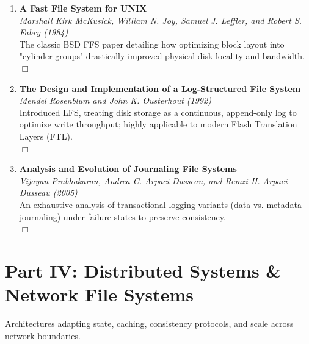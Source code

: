 \documentclass[11pt,a4paper]{article}
\begin{document}
\begin{enumerate}[resume]
    \item \textbf{A Fast File System for UNIX} \\
    \textit{Marshall Kirk McKusick, William N. Joy, Samuel J. Leffler, and Robert S. Fabry (1984)} \\
    The classic BSD FFS paper detailing how optimizing block layout into "cylinder groups" drastically improved physical disk locality and bandwidth. \\
    $\Box$
    
    \item \textbf{The Design and Implementation of a Log-Structured File System} \\
    \textit{Mendel Rosenblum and John K. Ousterhout (1992)} \\
    Introduced LFS, treating disk storage as a continuous, append-only log to optimize write throughput; highly applicable to modern Flash Translation Layers (FTL). \\
    $\Box$
    
    \item \textbf{Analysis and Evolution of Journaling File Systems} \\
    \textit{Vijayan Prabhakaran, Andrea C. Arpaci-Dusseau, and Remzi H. Arpaci-Dusseau (2005)} \\
    An exhaustive analysis of transactional logging variants (data vs. metadata journaling) under failure states to preserve consistency. \\
    $\Box$
\end{enumerate}

\section{Part IV: Distributed Systems \& Network File Systems}
Architectures adapting state, caching, consistency protocols, and scale across network boundaries.
\end{document}
